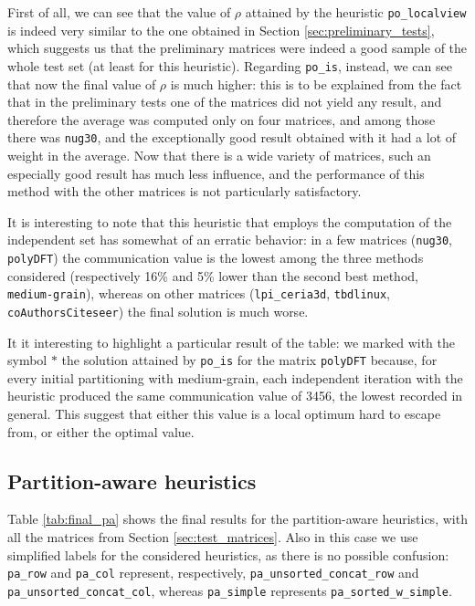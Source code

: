 First of all, we can see that the value of $\rho$ attained by the heuristic \verb|po_localview| is indeed very similar to the one obtained in Section \ref{sec:preliminary_tests}, which suggests us that the preliminary matrices were indeed a good sample of the whole test set (at least for this heuristic). Regarding \verb|po_is|, instead, we can see that now the final value of $\rho$ is much higher: this is to be explained from the fact that in the preliminary tests one of the matrices did not yield any result, and therefore the average was computed only on four matrices, and among those there was \verb|nug30|, and the exceptionally good result obtained with it had a lot of weight in the average. Now that there is a wide variety of matrices, such an especially good result has much less influence, and the performance of this method with the other matrices is not particularly satisfactory.

It is interesting to note that this heuristic that employs the computation of the independent set has somewhat of an erratic behavior: in a few matrices (\verb|nug30|, \verb|polyDFT|) the communication value is the lowest among the three methods considered (respectively 16\% and 5\% lower than the second best method, \verb|medium-grain|), whereas on other matrices (\verb|lpi_ceria3d|, \verb|tbdlinux|, \verb|coAuthorsCiteseer|) the final solution is much worse.

It it interesting to highlight a particular result of the table: we marked with the symbol $*$ the solution attained by \verb|po_is| for the matrix \verb|polyDFT| because, for every initial partitioning with medium-grain, each independent iteration with the heuristic produced the same communication value of 3456, the lowest recorded in general. This suggest that either this value is a local optimum hard to escape from, or either the optimal value.

\subsection{Partition-aware heuristics}

Table \ref{tab:final_pa} shows the final results for the partition-aware heuristics, with all the matrices from Section \ref{sec:test_matrices}. Also in this case we use simplified labels for the considered heuristics, as there is no possible confusion: \verb|pa_row| and \verb|pa_col| represent, respectively, \verb|pa_unsorted_concat_row| and \verb|pa_unsorted_concat_col|, whereas \verb|pa_simple| represents \verb|pa_sorted_w_simple|.

